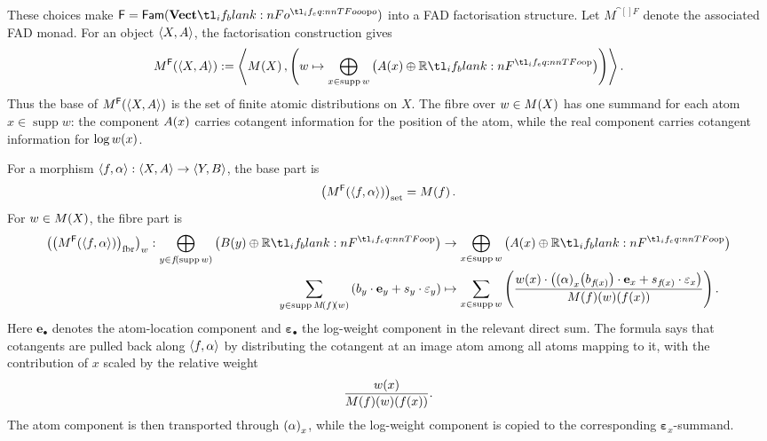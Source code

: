 \documentclass[11pt,a4paper]{article}
\theoremstyle{definition}
\theoremstyle{remark}
\providecommand{\Fam}[1]{\mathsf{Fam}(#1)}
\providecommand{\supp}{\operatorname{supp}}
\providecommand{\base}[1]{\left(#1\right)_{\mathrm{set}}}
\providecommand{\fibr}[1]{\left(#1\right)_{\mathrm{fbr}}}
\providecommand{\vect}[1]{\mathbf{#1}}
\begin{document}
These choices make \( \cat[]{F}=\Fam{\Vect[o]} \) into a FAD factorisation
structure. Let \(M^{\cat[]{F}}\) denote the associated FAD monad. For an object
\( \left\langle X,A\right\rangle \), the factorisation construction gives
\begin{equation}
	\label{eq:fad-monad-on-objects-in-fam-vectop}
	\Fun[nn]{ M^{\cat[]{F}} }{ \tuple{ X, A } } :=
	\tuple{
		\Fun[nn]{ M }{ X },
		\left(
		w \mapsto \bigoplus_{x \in \supp w} \left( \Fun[np]{ A }{ x } \oplus \R \right)
		\right)
	}.
\end{equation}
Thus the base of \( \Fun[nn]{ M^{\cat[]{F}} }{ \tuple{X,A} } \) is the set of
finite atomic distributions on \(X\). The fibre over
\( w\in\Fun[nn]{M}{X} \) has one summand for each atom \(x\in\supp w\): the
component \( \Fun[np]{A}{x} \) carries cotangent information for the position
of the atom, while the real component carries cotangent information for
\( \log \fn[n]{w}{x} \).

For a morphism
\( \left\langle f,\alpha\right\rangle:\left\langle X,A\right\rangle\to\left\langle Y,B\right\rangle \), the base part is
\[
\base{ \Fun[nn]{ M^{\cat[]{F}} }{ \tuple{ f, \alpha } } }
=
\Fun[nn]{ M }{ f } .
\]
For \( w\in\Fun[nn]{M}{X} \), the fibre part is
\begin{equation}
	\label{eq:fad-monad-on-morphisms-in-fam-vectop}
	\begin{aligned}
		\Nat[nn]{ \fibr{\Fun[nn]{ M^{\cat[]{F}} }{ \tuple{ f, \alpha } }} }{ w }:
		\bigoplus_{y \in \fn[n]{ f }{ \supp w }} \left( \Fun[np]{ B }{ y } \oplus \R \right)
		&\to
		\bigoplus_{x \in \supp w} \left( \Fun[np]{ A }{ x } \oplus \R \right)
		\\
		\sum_{y \in \supp \fn[n]{ \Fun{ M }{ f } }{ w }}
		\left(
		b_{y} \cdot \vect{ e }_{y}
		+
		s_{y} \cdot \vect{ \varepsilon }_{y}
		\right)
		&\mapsto
		\sum_{x \in \supp w}
		\left(
		\frac{
			\fn[n]{ w }{ x } \cdot
			\left(
			\fn[n]{ \Nat{ \alpha }{ x } }{ b_{\fn[n]{ f }{ x }} }
			\cdot \vect{ e }_{x}
			+
			s_{\fn[n]{ f }{ x }}
			\cdot \vect{ \varepsilon }_{x}
			\right)
		}{
			\fn[p]{ \fn[n]{ \Fun{ M }{ f } }{ w } }{ \fn[n]{ f }{ x } }
		}
		\right) .
	\end{aligned}
\end{equation}
Here \( \vect{e}_{\bullet} \) denotes the atom-location component and
\( \vect{\varepsilon}_{\bullet} \) the log-weight component in the relevant
direct sum. The formula says that cotangents are pulled back along
\( \left\langle f,\alpha\right\rangle \) by distributing the cotangent at an image atom among
all atoms mapping to it, with the contribution of \(x\) scaled by the relative
weight
\[
\frac{
	\fn[n]{ w }{ x }
}{
	\fn[p]{ \fn[n]{ \Fun{ M }{ f } }{ w } }{ \fn[n]{ f }{ x } }
} .
\]
The atom component is then transported through \( \Nat[nn]{\alpha}{x} \),
while the log-weight component is copied to the corresponding
\( \vect{\varepsilon}_{x} \)-summand.
\end{document}
